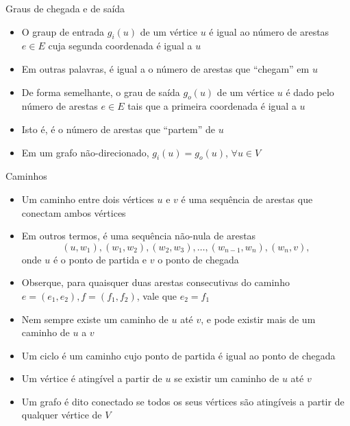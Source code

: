 



\begin{frame}[fragile]{Graus de chegada e de saída}

    \begin{itemize}
        \item O graup de entrada $g_i(u)$ de um vértice $u$ é igual ao número de arestas $e\in E$
            cuja segunda coordenada é igual a $u$

        \item Em outras palavras, é igual a o número de arestas que ``chegam'' em $u$

        \item De forma semelhante, o grau de saída $g_o(u)$ de um vértice $u$ é dado pelo número
            de arestas $e\in E$ tais que a primeira coordenada é igual a $u$

        \item Isto é, é o número de arestas que ``partem'' de $u$

        \item Em um grafo não-direcionado, $g_i(u) = g_o(u)$, $\forall u\in V$
    \end{itemize}

\end{frame}



\begin{frame}[fragile]{Caminhos}

    \begin{itemize}
        \item Um caminho entre dois vértices $u$ e $v$ é uma sequência de arestas que conectam
            ambos vértices

        \item Em outros termos, é uma sequência não-nula de arestas
        \[
            (u, w_1), (w_1, w_2), (w_2, w_3), \ldots, (w_{n-1}, w_n), (w_n, v),
        \]
        onde $u$ é o ponto de partida e $v$ o ponto de chegada

        \item Obserque, para quaisquer duas arestas consecutivas do caminho 
            $e = (e_1, e_2), f = (f_1, f_2)$, vale que $e_2 = f_1$

        \item Nem sempre existe um caminho de $u$ até $v$, e pode existir mais de um caminho de
            $u$ a $v$

        \item Um ciclo é um caminho cujo ponto de partida é igual ao ponto de chegada

        \item Um vértice é atingível a partir de $u$ se existir um caminho de $u$ até $v$

        \item Um grafo é dito conectado se todos os seus vértices são atingíveis a partir de 
            qualquer vértice de $V$
    \end{itemize}

\end{frame}



